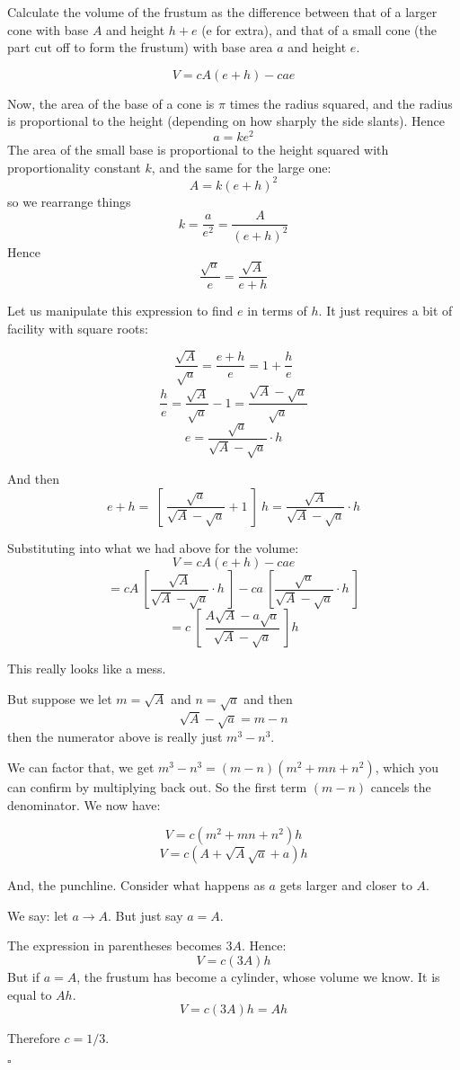 \documentclass[11pt, oneside]{article}
\begin{document}
Calculate the volume of the frustum as the difference between that of a larger cone with base $A$ and height $h + e$ (e for extra), and that of a small cone (the part cut off to form the frustum) with base area $a$ and height $e$.

\[ V = cA(e + h) - cae \]

Now, the area of the base of a cone is $\pi$ times the radius squared, and the radius is proportional to the height (depending on how sharply the side slants).  Hence
\[ a = ke^2 \]
The area of the small base is proportional to the height squared with proportionality constant $k$, and the same for the large one:
\[ A = k(e + h)^2 \]
so we rearrange things
\[ k = \frac{a}{e^2} =\frac{A}{(e+h)^2} \]
Hence
\[ \frac{\sqrt{a}}{e} = \frac{\sqrt{A}}{e + h} \]

Let us manipulate this expression to find $e$ in terms of $h$.  It just requires a bit of facility with square roots:

\[ \frac{\sqrt{A}}{\sqrt{a}} = \frac{e + h}{e} = 1 + \frac{h}{e} \]
\[ \frac{h}{e} = \frac{\sqrt{A}}{\sqrt{a}} - 1 = \frac{\sqrt{A} - \sqrt{a}}{\sqrt{a}} \]
\[ e = \frac{\sqrt{a}}{\sqrt{A} - \sqrt{a}} \cdot h \]

And then
\[ e + h = \ [ \  \frac{\sqrt{a}}{\sqrt{A} - \sqrt{a}} + 1 \ ] \ h =\frac{\sqrt{A}}{\sqrt{A} - \sqrt{a}} \cdot h \]

Substituting into what we had above for the volume:
\[ V = cA(e+h) - cae \]
\[ = cA \ [ \frac{\sqrt{A}}{\sqrt{A} - \sqrt{a}} \cdot h \ ] - ca \ [ \frac{\sqrt{a}}{\sqrt{A} - \sqrt{a}}  \cdot h \ ] \]
\[ = c \ [ \   \frac{A \sqrt{A} - a \sqrt{a}}{\sqrt{A} - \sqrt{a}} \ ] h \]

This really looks like a mess.  

But suppose we let $m =  \sqrt{A}$ and $n =  \sqrt{a}$ and then
\[ \sqrt{A} - \sqrt{a} = m - n \]
then the numerator above is really just $m^3 - n^3$.    

We can factor that, we get $m^3 - n^3 = (m-n)(m^2 + mn + n^2)$, which you can confirm by multiplying back out.  So the first term $(m-n)$ cancels the denominator.  We now have:

\[ V = c (m^2 + mn + n^2) h \]
\[ V = c (A + \sqrt{A} \sqrt{a} + a) h \]

And, the punchline.  Consider what happens as $a$ gets larger and closer to $A$.

We say:  let $a \rightarrow A$.  But just say $a = A$.

The expression in parentheses becomes $3A$.  Hence:
\[ V = c(3A)h \]
But if $a = A$, the frustum has become a cylinder, whose volume we know.  It is equal to $Ah$. 
\[ V = c(3A)h = Ah \]

Therefore $c = 1/3$.

$\square$
\end{document}
